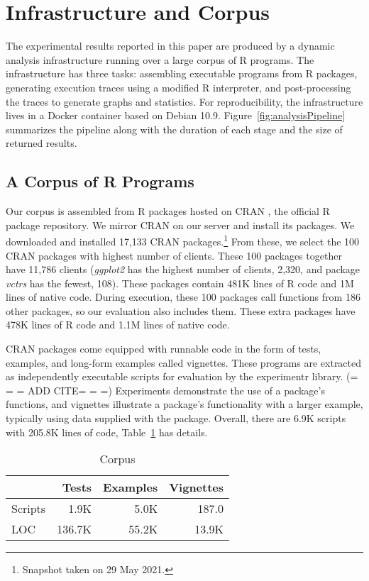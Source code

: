 \documentclass[10pt,review,sigplan,authorversion=true]{acmart}
\newcommand{\experimentr}{{\sf experimentr}\xspace}
\newcommand{\ggplot}{\textit{ggplot2}\xspace}
\newcommand{\vctrs}{\textit{vctrs}\xspace}
\begin{document}
\section{Infrastructure and Corpus}

The experimental results reported in this paper are produced by a dynamic
analysis infrastructure running over a large corpus of R programs. The
infrastructure has three tasks: assembling executable programs from R packages,
generating execution traces using a modified R interpreter, and post-processing
the traces to generate graphs and statistics. For reproducibility, the
infrastructure lives in a Docker container based on Debian 10.9.
Figure~\ref{fig:analysisPipeline} summarizes the pipeline along with the
duration of each stage and the size of returned results.

\subsection{A Corpus of R Programs}

Our corpus is assembled from R packages hosted on CRAN \cite{ligges2017}, the
official R package repository. We mirror CRAN on our server and install its
packages. We downloaded and installed 17,133 CRAN packages.\footnote{Snapshot
taken on 29 May 2021.} From these, we select the 100 CRAN packages with highest
number of clients. These 100 packages together have 11,786 clients (\ggplot has
the highest number of clients, 2,320, and package \vctrs has the fewest, 108).
These packages contain 481K lines of R code and 1M lines of native code. During
execution, these 100 packages call functions from 186 other packages, so our
evaluation also includes them. These extra packages have 478K lines of R code
and 1.1M lines of native code.

CRAN packages come equipped with runnable code in the form of tests, examples,
and long-form examples called vignettes. These programs are extracted as
independently executable scripts for evaluation by the \experimentr library. (=
= = ADD CITE= = =) Experiments demonstrate the use of a package's functions, and
vignettes illustrate a package's functionality with a larger example, typically
using data supplied with the package. Overall, there are 6.9K scripts with
205.8K lines of code, Table~\ref{table:corpus} has details.

\begin{table}[!h]  \vspace{-3mm}  \small  \centering
  \caption{Corpus}\label{table:corpus}
  \vspace{-3mm}
  \begin{tabular}{lrrr}    \toprule
    &\bf Tests&\bf Examples&\bf Vignettes\\    \midrule
    {Scripts}&1.9K&5.0K&187.0\\    \midrule
    {LOC}&136.7K&55.2K&13.9K\\
    \bottomrule
  \end{tabular}
\end{table}
\end{document}
